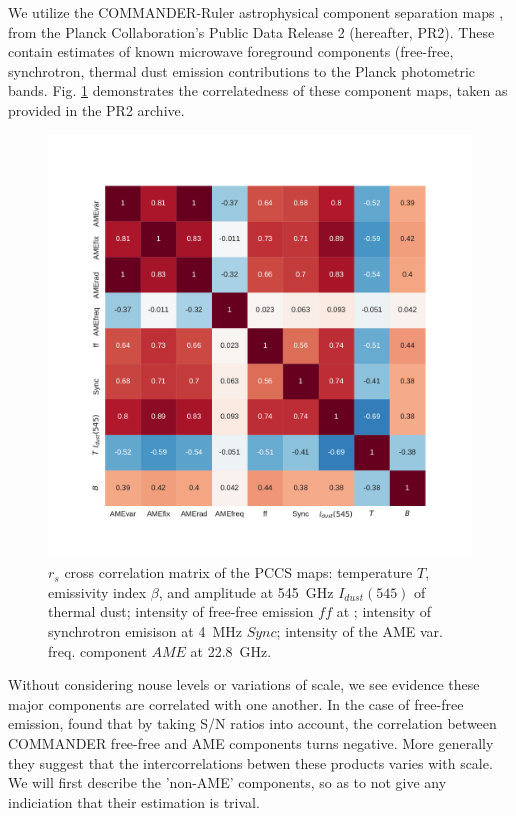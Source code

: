        We utilize the COMMANDER-Ruler astrophysical component separation maps \citep{planckXII}, from the Planck Collaboration's Public Data Release 2 (hereafter, PR2)\citep{planck2015I}. These contain estimates of known microwave foreground components (free-free, synchrotron, thermal dust emission contributions to the Planck photometric bands. Fig. \ref{fig:PCCS_corrmatrix} demonstrates the correlatedness of these component maps, taken as provided in the PR2 archive.
       \begin{figure}
         \includegraphics[width=\textwidth]{../Plots/ch_datasources/PCCS_corrmatrix.pdf}
         \centering
         \caption{$r_{s}$ cross correlation matrix of the PCCS maps: temperature $T$, emissivity index $\beta$, and amplitude at 545~GHz $I_{dust}(545)$ of thermal dust; intensity of free-free emission $ff$ at ; intensity of synchrotron emisison at 4~MHz $Sync$; intensity of the AME var. freq. component $AME$ at 22.8~GHz.}
         \label{fig:PCCS_corrmatrix}
       \end{figure}
        Without considering nouse levels or variations of scale, we see evidence these major components are correlated with one another. In the case of free-free emission,  \cite{vonHausegger15} found that by taking S/N ratios into account, the correlation between COMMANDER free-free and AME components turns negative. More generally they suggest that the intercorrelations betwen these products varies with scale. We will first describe the 'non-AME' components, so as to not give any indiciation that their estimation is trival.


